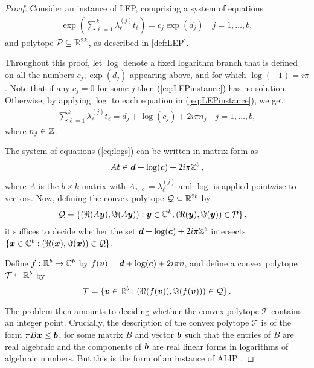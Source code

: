 \begin{proof}
Consider an instance of LEP, comprising a system of equations
\begin{align}
 \exp\left(\sum_{\ell=1}^k \lambda_\ell^{(j)} t_\ell \right) = c_j \exp (d_j)
\quad j=1,\ldots,b,
\label{eq:LEPinstance}
\end{align}
and polytope $\mathcal{P}\subseteq \mathbb{R}^{2k}$, as described in
\cref{def:LEP}.

Throughout this proof, let $\log$ denote a fixed logarithm branch that
is defined on all the numbers $c_j, \exp(d_j)$ appearing
above, and for which $\log(-1) = i \pi$. Note that if any $c_j=0$ for
some $j$ then (\ref{eq:LEPinstance}) has no solution. Otherwise, by
applying $\log$ to each equation in (\ref{eq:LEPinstance}),
we get:
\begin{align}
\sum_{\ell=1}^k \lambda_\ell^{(j)} t_\ell = d_j+\log(c_j) + 2i\pi n_j \quad j=1,\ldots,b,
\label{eq:logs}
\end{align}
where $n_j \in \mathbb{Z}$.

The system of equations (\ref{eq:logs}) can be written in matrix form as
\begin{align*}
A \boldsymbol{t} \in \boldsymbol{d}+\log(\boldsymbol{c}) +
2i\pi \mathbb{Z}^b \, ,
\end{align*}
where $A$ is the $b\times k$ matrix with $A_{j,\ell} = \lambda_\ell^{(j)}$ and $\log$
is applied pointwise to vectors.
Now, defining the convex polytope $\mathcal{Q}\subseteq \mathbb{R}^{2b}$ by
\begin{align*}
\mathcal{Q} = \lbrace &(\Re(A\boldsymbol{y}), \Im(A\boldsymbol{y})) :
\boldsymbol{y}\in\mathbb{C}^k, (\Re(\boldsymbol{y}), \Im(\boldsymbol{y})) \in \mathcal{P} \rbrace \, ,
\end{align*}
it suffices to decide whether the set
$\boldsymbol{d} + \log(\boldsymbol{c})+ 2i\pi  \mathbb{Z}^b$
intersects
$\lbrace \boldsymbol{x} \in \mathbb{C}^b : (\Re(\boldsymbol{x}),
\Im(\boldsymbol{x})) \in \mathcal{Q} \rbrace$.

Define $f:\mathbb{R}^b \rightarrow \mathbb{C}^b$ by
$f(\boldsymbol{v})= \boldsymbol{d} + \log(\boldsymbol{c}) +
2i\pi \boldsymbol{v}$,
and define a convex polytope $\mathcal{T}\subseteq \mathbb{R}^b$ by
\[\mathcal{T}=\{ \boldsymbol{v}\in\mathbb{R}^b : (\Re(f(\boldsymbol{v})),
\Im (f(\boldsymbol{v}))) \in \mathcal{Q} \} \, . \]

The problem then amounts to deciding whether the convex polytope
$\mathcal{T}$ contains an integer point. Crucially, the
description of the convex polytope $\mathcal{T}$ is of the form
$\pi B\boldsymbol{x} \leq \boldsymbol{b}$, for some matrix $B$ and
vector $\boldsymbol{b}$ such that the entries of $B$ are real
algebraic and the components of $\boldsymbol{b}$ are real linear forms
in logarithms of algebraic numbers.  But this is the form of an
instance of ALIP \@.
\end{proof}

